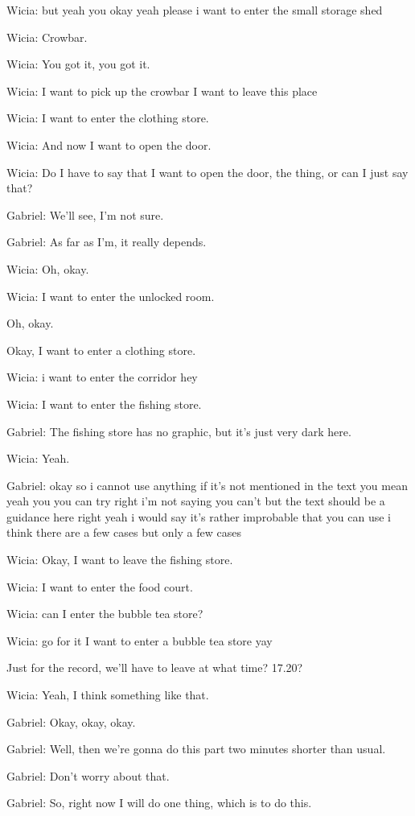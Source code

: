 Wicia: but yeah you okay yeah please i want to enter the small storage shed

Wicia: Crowbar.

Wicia: You got it, you got it.

Wicia: I want to pick up the crowbar I want to leave this place

Wicia: I want to enter the clothing store.

Wicia: And now I want to open the door.

Wicia: Do I have to say that I want to open the door, the thing, or can I just say that?

Gabriel: We'll see, I'm not sure.

Gabriel: As far as I'm, it really depends.

Wicia: Oh, okay.

Wicia: I want to enter the unlocked room.

Oh, okay.

Okay, I want to enter a clothing store.

Wicia: i want to enter the corridor hey

Wicia: I want to enter the fishing store.

Gabriel: The fishing store has no graphic, but it's just very dark here.

Wicia: Yeah.

Gabriel: okay so i cannot use anything if it's not mentioned in the text you mean yeah you you can try right i'm not saying you can't but the text should be a guidance here right yeah i would say it's rather improbable that you can use i think there are a few cases but only a few cases

Wicia: Okay, I want to leave the fishing store.

Wicia: I want to enter the food court.

Wicia: can I enter the bubble tea store?

Wicia: go for it I want to enter a bubble tea store yay

Just for the record, we'll have to leave at what time? 17.20?

Wicia: Yeah, I think something like that.

Gabriel: Okay, okay, okay.

Gabriel: Well, then we're gonna do this part two minutes shorter than usual.

Gabriel: Don't worry about that.

Gabriel: So, right now I will do one thing, which is to do this.

